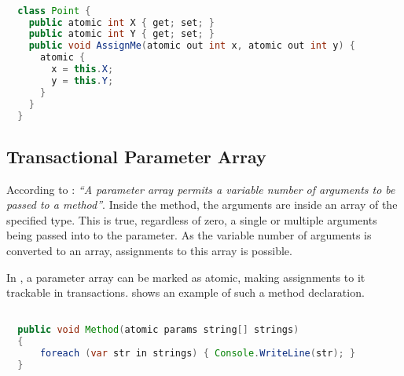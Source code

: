 \begin{lstlisting}[label=lst:atomic_out,
  caption={Transactional Output Parameter},
  language=Java,  
  showspaces=false,
  showtabs=false,
  breaklines=true,
  showstringspaces=false,
  breakatwhitespace=true,
  commentstyle=\color{greencomments},
  keywordstyle=\color{bluekeywords},
  stringstyle=\color{redstrings},
  morekeywords={atomic, retry, orElse, var, get, set}]  % Start your code-block

  class Point {
    public atomic int X { get; set; }
    public atomic int Y { get; set; }
    public void AssignMe(atomic out int x, atomic out int y) {
      atomic { 
        x = this.X;
        y = this.Y;
      }
    }    
  }
\end{lstlisting}

\subsection{Transactional Parameter Array}
According to \cite[p. 17]{csharp2013specificaiton}: \textit{``A parameter array permits a variable number of arguments to be passed to a method''}. Inside the method, the arguments are inside an array of the specified type. This is true, regardless of zero, a single or multiple arguments being passed into to the parameter. As the variable number of arguments is converted to an array, assignments to this array is possible. 

In \stmnamesp, a parameter array can be marked as atomic, making assignments to it trackable in transactions.  shows an example of such a method declaration.

\begin{lstlisting}[label=lst:design_param_array,
  caption={Transactional Parameter Array},
  language=Java,  
  showspaces=false,
  showtabs=false,
  breaklines=true,
  showstringspaces=false,
  breakatwhitespace=true,
  commentstyle=\color{greencomments},
  keywordstyle=\color{bluekeywords},
  stringstyle=\color{redstrings},
  morekeywords={atomic, retry, orElse, var, get, set, params, string, in, foreach}]  % Start your code-block

  public void Method(atomic params string[] strings)
  {
      foreach (var str in strings) { Console.WriteLine(str); }
  }
    
\end{lstlisting}
